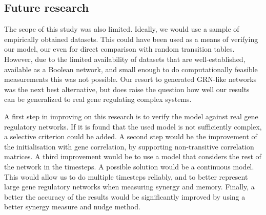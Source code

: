 \documentclass[../main.tex]{subfiles}
\begin{document}
\subsection{Future research}

The scope of this study was also limited.
Ideally, we would use a sample of empirically obtained datasets.
This could have been used as a means of verifying our model, our even for direct comparison with random transition tables. %
However, due to the limited availability of datasets that are well-established, available as a Boolean network, and small enough to do computationally feasible measurements this was not possible.
Our resort to generated GRN-like networks was the next best alternative, but does raise the question how well our results can be generalized to real gene regulating complex systems.

A first step in improving on this research is to verify the model against real gene regulatory networks.
If it is found that the used model is not sufficiently complex, a selective criterion could be added.
A second step would be the improvement of the initialisation with gene correlation, by supporting non-transitive correlation matrices.
A third improvement would be to use a model that considers the rest of the network in the timesteps.
A possible solution would be a continuous model.
This would allow us to do multiple timesteps reliably, and to better represent large gene regulatory networks when measuring synergy and memory. %
Finally, a better the accuracy of the results would be significantly improved by using a better synergy measure and nudge method.
\end{document}
